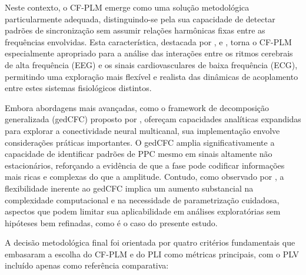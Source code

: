 Neste contexto, o CF-PLM emerge como uma solução metodológica particularmente adequada, distinguindo-se pela sua capacidade de detectar padrões de sincronização sem assumir relações harmônicas fixas entre as frequências envolvidas. Esta característica, destacada por ,  e , torna o CF-PLM especialmente apropriado para a análise das interações entre os ritmos cerebrais de alta frequência (EEG) e os sinais cardiovasculares de baixa frequência (ECG), permitindo uma exploração mais flexível e realista das dinâmicas de acoplamento entre estes sistemas fisiológicos distintos.

Embora abordagens mais avançadas, como o framework de decomposição generalizada (gedCFC) proposto por , ofereçam capacidades analíticas expandidas para explorar a conectividade neural multicanal, sua implementação envolve considerações práticas importantes. O gedCFC amplia significativamente a capacidade de identificar padrões de PPC mesmo em sinais altamente não estacionários, reforçando a evidência de que a fase pode codificar informações mais ricas e complexas do que a amplitude. Contudo, como observado por , a flexibilidade inerente ao gedCFC implica um aumento substancial na complexidade computacional e na necessidade de parametrização cuidadosa, aspectos que podem limitar sua aplicabilidade em análises exploratórias sem hipóteses bem refinadas, como é o caso do presente estudo.

A decisão metodológica final foi orientada por quatro critérios fundamentais que embasaram a escolha do CF-PLM e do PLI como métricas principais, com o PLV incluído apenas como referência comparativa:

